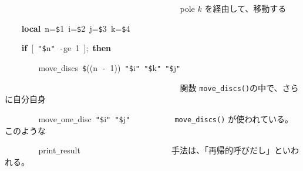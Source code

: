 \documentclass[a4paper,10pt]{article}
\def\mc{\relax}
\begin{document}
\noindent
\mbox{}{\tt\mc \ }{\tt\mc \ }{\tt\mc \ }{\tt\mc \ }{\tt\mc \ }{\tt\mc \ }{\tt\mc \ }{\tt\mc \ }{\tt\mc \ }{\tt\mc \ }{\tt\mc \ }{\tt\mc \ }{\tt\mc \ }{\tt\mc \ }{\tt\mc \ }{\tt\mc \ }{\tt\mc \ }{\tt\mc \ }{\tt\mc \ }{\tt\mc \ }{\tt\mc \ }{\tt\mc \ }{\tt\mc \ }{\tt\mc \ }{\tt\mc \ }{\tt\mc \ }{\tt\mc \ }{\tt\mc \ }{\tt\mc \ }{\tt\mc \ }{\tt\mc \ }{\tt\mc \ }{\tt\mc \ }{\tt\mc \ }{\tt\mc \ }{\tt\mc \ }{\tt\mc \ }{\tt\mc \ }{\tt\mc \ }{\tt\mc \ }\rm\mc {\tt\#} \ pole $k$ を経由して、移動する\hfill 
\tt\mc 

\noindent
\mbox{}{\tt\mc \ }{\tt\mc \ }{\tt\mc \ }{\tt\mc \ }\textbf{local}{\tt\mc \ }n={\tt\$}1{\tt\mc \ }i={\tt\$}2{\tt\mc \ }j={\tt\$}3{\tt\mc \ }k={\tt\$}4

\noindent
\mbox{}{\tt\mc \ }{\tt\mc \ }{\tt\mc \ }{\tt\mc \ }\textbf{if}{\tt\mc \ }[{\tt\mc \ }{\tt "}{\tt\$}n{\tt "}{\tt\mc \ }{\tt -}ge{\tt\mc \ }1{\tt\mc \ }];{\tt\mc \ }\textbf{then}

\noindent
\mbox{}{\tt\mc \ }{\tt\mc \ }{\tt\mc \ }{\tt\mc \ }{\tt\mc \ }{\tt\mc \ }{\tt\mc \ }{\tt\mc \ }move{\tt\_}discs{\tt\mc \ }{\tt\$}((n{\tt\mc \ }{\tt -}{\tt\mc \ }1)){\tt\mc \ }{\tt "}{\tt\$}i{\tt "}{\tt\mc \ }{\tt "}{\tt\$}k{\tt "}{\tt\mc \ }{\tt "}{\tt\$}j{\tt "}

\noindent
\mbox{}{\tt\mc \ }{\tt\mc \ }{\tt\mc \ }{\tt\mc \ }{\tt\mc \ }{\tt\mc \ }{\tt\mc \ }{\tt\mc \ }{\tt\mc \ }{\tt\mc \ }{\tt\mc \ }{\tt\mc \ }{\tt\mc \ }{\tt\mc \ }{\tt\mc \ }{\tt\mc \ }{\tt\mc \ }{\tt\mc \ }{\tt\mc \ }{\tt\mc \ }{\tt\mc \ }{\tt\mc \ }{\tt\mc \ }{\tt\mc \ }{\tt\mc \ }{\tt\mc \ }{\tt\mc \ }{\tt\mc \ }{\tt\mc \ }{\tt\mc \ }{\tt\mc \ }{\tt\mc \ }{\tt\mc \ }{\tt\mc \ }{\tt\mc \ }{\tt\mc \ }{\tt\mc \ }{\tt\mc \ }{\tt\mc \ }{\tt\mc \ }\rm\mc {\tt\#} \ 関数 {\tt move\_discs()}の中で、さらに自分自身 \hfill 
\tt\mc 

\noindent
\mbox{}{\tt\mc \ }{\tt\mc \ }{\tt\mc \ }{\tt\mc \ }{\tt\mc \ }{\tt\mc \ }{\tt\mc \ }{\tt\mc \ }move{\tt\_}one{\tt\_}disc{\tt\mc \ }{\tt "}{\tt\$}i{\tt "}{\tt\mc \ }{\tt "}{\tt\$}j{\tt "}{\tt\mc \ }{\tt\mc \ }{\tt\mc \ }{\tt\mc \ }{\tt\mc \ }{\tt\mc \ }{\tt\mc \ }{\tt\mc \ }{\tt\mc \ }\rm\mc {\tt\#} \ {\tt move\_discs()} が使われている。このような \hfill 
\tt\mc 

\noindent
\mbox{}{\tt\mc \ }{\tt\mc \ }{\tt\mc \ }{\tt\mc \ }{\tt\mc \ }{\tt\mc \ }{\tt\mc \ }{\tt\mc \ }print{\tt\_}result{\tt\mc \ }{\tt\mc \ }{\tt\mc \ }{\tt\mc \ }{\tt\mc \ }{\tt\mc \ }{\tt\mc \ }{\tt\mc \ }{\tt\mc \ }{\tt\mc \ }{\tt\mc \ }{\tt\mc \ }{\tt\mc \ }{\tt\mc \ }{\tt\mc \ }{\tt\mc \ }{\tt\mc \ }{\tt\mc \ }{\tt\mc \ }{\tt\mc \ }\rm\mc {\tt\#} \ 手法は、「再帰的呼びだし」といわれる。 \hfill 
\tt\mc 
\end{document}
